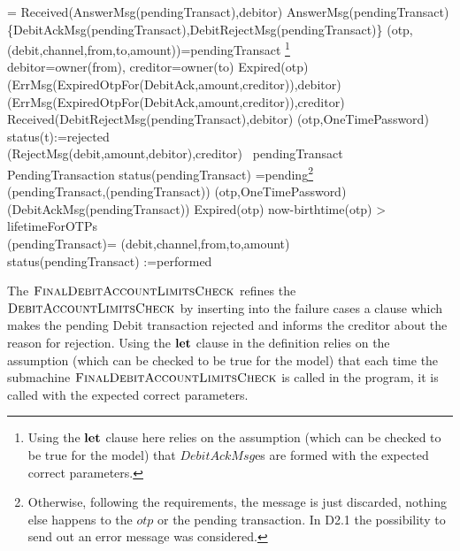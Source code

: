 \begin{asm}  
 =\+           
\IF Received(AnswerMsg(pendingTransact),\FROM debitor)\+
\AND AnswerMsg(pendingTransact) \in \+
 \{DebitAckMsg(pendingTransact),DebitRejectMsg(pendingTransact)\} \THEN \dec \-
\LET (otp, (debit,channel,from,to,amount))=pendingTransact \footnote{Using the $\mathrel{\mathbf{let}}$ clause here relies on the assumption (which can be checked to be true for the model) that $DebitAckMsg$es are formed with the expected correct parameters.}\\
 \LET debitor=owner(from), creditor=owner(to)\+
  \IF Expired(otp) \THEN \+
    (ErrMsg(ExpiredOtpFor(DebitAck,amount,creditor)),\TO debitor) \\
    (ErrMsg(ExpiredOtpFor(DebitAck,amount,creditor)),\TO creditor)\-
   \ELSE ~\IF   
      Received(DebitRejectMsg(pendingTransact),\FROM debitor) \THEN \+
          (otp,OneTimePassword) \\
          status(t):=rejected\\
          (RejectMsg(debit,amount,debitor),\TO creditor)\-         
  \ELSE ~\IF pendingTransact  \in PendingTransaction \AND
    status(pendingTransact) =pending\footnote{Otherwise, following the requirements, the message is just discarded, nothing else happens to the $otp$ or the pending transaction. In D2.1 the possibility to send out an error message was considered.}  \+
       \THEN \+
          \+
              ~~~~~~ (pendingTransact,(pendingTransact))\-
                (otp,OneTimePassword)\dec\dec\-  
(DebitAckMsg(pendingTransact)) \dec\dec\-
\WHERE \+
Expired(otp) \IFF now-birthtime(otp) > lifetimeForOTPs\\
(pendingTransact)=\+
   (debit,channel,from,to,amount)\\
  status(pendingTransact) :=performed
\end{asm}

The $\hbox{\sc FinalDebitAccountLimitsCheck}$ refines the  $\hbox{\sc DebitAccountLimitsCheck}$ by inserting into the failure cases a clause which makes the pending Debit transaction rejected and informs the creditor about the reason for rejection. Using the $\mathrel{\mathbf{let}}$ clause in the definition relies on the assumption (which can be checked to be true for the model) that each time the submachine $\hbox{\sc FinalDebitAccountLimitsCheck}$ is called in the program, it is called with the expected correct parameters.

